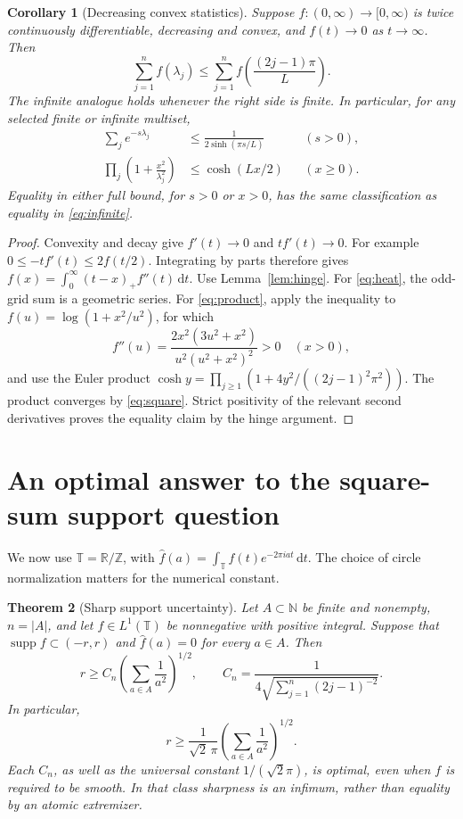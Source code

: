 \documentclass[11pt]{article}
\newtheorem{theorem}{Theorem}[section]
\newtheorem{corollary}[theorem]{Corollary}
\theoremstyle{remark}\newtheorem{remark}[theorem]{Remark}
\newcommand{\R}{\mathbb R}
\newcommand{\N}{\mathbb N}
\newcommand{\Z}{\mathbb Z}
\newcommand{\T}{\mathbb T}
\newcommand{\dd}{\,\mathrm d}
\newcommand{\supp}{\operatorname{supp}}
\newcommand{\pos}[1]{(#1)_+}
\begin{document}
\begin{corollary}[Decreasing convex statistics]\label{cor:convex}
Suppose $f:(0,\infty)\to[0,\infty)$ is twice continuously differentiable,
decreasing and convex, and $f(t)\to0$ as $t\to\infty$. Then
\[
 \sum_{j=1}^n f(\lambda_j)\le
 \sum_{j=1}^n f\!\left(\frac{(2j-1)\pi}{L}\right).
\]
The infinite analogue holds whenever the right side is finite. In particular,
for any selected finite or infinite multiset,
\begin{align}
 \sum_j e^{-s\lambda_j}&\le\frac1{2\sinh(\pi s/L)}&& (s>0),\label{eq:heat}\\
 \prod_j\left(1+\frac{x^2}{\lambda_j^2}\right)&\le\cosh(Lx/2)&& (x\ge0).
 \label{eq:product}
\end{align}
Equality in either full bound, for $s>0$ or $x>0$, has the same classification
as equality in \eqref{eq:infinite}.
\end{corollary}

\begin{proof}
Convexity and decay give $f'(t)\to0$ and $t f'(t)\to0$. For example
$0\le-tf'(t)\le2f(t/2)$. Integrating by parts therefore gives
$f(x)=\int_0^\infty\pos{t-x}f''(t)\dd t$.
Use Lemma~\ref{lem:hinge}. For \eqref{eq:heat}, the odd-grid sum is a geometric
series. For \eqref{eq:product}, apply the inequality to
$f(u)=\log(1+x^2/u^2)$, for which
\[
 f''(u)=\frac{2x^2(3u^2+x^2)}{u^2(u^2+x^2)^2}>0\quad(x>0),
\]
and use the Euler product
$\cosh y=\prod_{j\ge1}(1+4y^2/((2j-1)^2\pi^2))$.
The product converges by \eqref{eq:square}. Strict positivity of the relevant
second derivatives proves the equality claim by the hinge argument.
\end{proof}

\section{An optimal answer to the square-sum support question}

We now use $\T=\R/\Z$, with
$\widehat f(a)=\int_\T f(t)e^{-2\pi iat}\dd t$.
The choice of circle normalization matters for the numerical constant.

\begin{theorem}[Sharp support uncertainty]\label{thm:support}
Let $A\subset\N$ be finite and nonempty, $n=|A|$, and let
$f\in L^1(\T)$ be nonnegative with positive integral. Suppose that
$\supp f\subset(-r,r)$ and $\widehat f(a)=0$ for every $a\in A$.
Then
\begin{equation}\label{eq:finite-support}
 r\ge C_n\left(\sum_{a\in A}\frac1{a^2}\right)^{1/2},\qquad
 C_n=\frac1{4\sqrt{\sum_{j=1}^n(2j-1)^{-2}}}.
\end{equation}
In particular,
\begin{equation}\label{eq:support}
 \boxed{\displaystyle r\ge\frac1{\sqrt2\,\pi}
             \left(\sum_{a\in A}\frac1{a^2}\right)^{1/2}.}
\end{equation}
Each $C_n$, as well as the universal constant $1/(\sqrt2\pi)$, is optimal,
even when $f$ is required to be smooth. In that class sharpness is an infimum,
rather than equality by an atomic extremizer.
\end{theorem}
\end{document}
